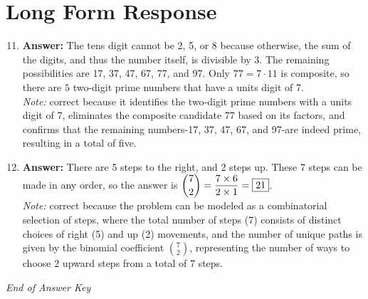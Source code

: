 \documentclass[12pt]{article}
\begin{document}
\section*{Long Form Response}
\begin{enumerate}[label=\arabic*.]
\setcounter{enumi}{10}
\item \textbf{Answer:} The tens digit cannot be 2, 5, or 8 because otherwise, the sum of the digits, and thus the number itself, is divisible by 3. The remaining possibilities are 17, 37, 47, 67, 77, and 97. Only $77=7\cdot 11$ is composite, so there are $\boxed{5}$ two-digit prime numbers that have a units digit of 7.
\\ \textit{Note:} correct because it identifies the two-digit prime numbers with a units digit of 7, eliminates the composite candidate 77 based on its factors, and confirms that the remaining numbers-17, 37, 47, 67, and 97-are indeed prime, resulting in a total of five.
\item \textbf{Answer:} There are 5 steps to the right, and 2 steps up. These 7 steps can be made in any order, so the answer is $\dbinom{7}{2} = \dfrac{7 \times 6}{2 \times 1} = \boxed{21}$.
\\ \textit{Note:} correct because the problem can be modeled as a combinatorial selection of steps, where the total number of steps (7) consists of distinct choices of right (5) and up (2) movements, and the number of unique paths is given by the binomial coefficient \(\binom{7}{2}\), representing the number of ways to choose 2 upward steps from a total of 7 steps.
\end{enumerate}

\vfill
\noindent\textit{End of Answer Key}
\end{document}
